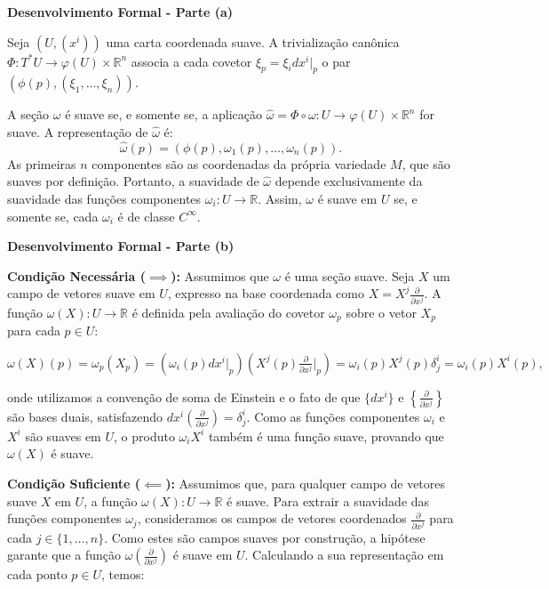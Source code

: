 {	\textbf{Desenvolvimento Formal - Parte (a)}
	
	Seja $(U, (x^i))$ uma carta coordenada suave. A trivialização canônica $\Phi: T^*U \to \varphi(U) \times \mathbb{R}^n$ associa a cada covetor $\xi_p = \xi_i dx^i|_p$ o par $(\phi(p), (\xi_1, \dots, \xi_n))$.
	
	A seção $\omega$ é suave se, e somente se, a aplicação $\hat{\omega} = \Phi \circ \omega : U \to \varphi(U) \times \mathbb{R}^n$ for suave. A representação de $\hat{\omega}$ é:
	\begin{equation*}
		\hat{\omega}(p) = (\phi(p), \omega_1(p), \dots, \omega_n(p)).
	\end{equation*}
	As primeiras $n$ componentes são as coordenadas da própria variedade $M$, que são suaves por definição. Portanto, a suavidade de $\hat{\omega}$ depende exclusivamente da suavidade das funções componentes $\omega_i : U \to \mathbb{R}$. Assim, $\omega$ é suave em $U$ se, e somente se, cada $\omega_i$ é de classe $C^\infty$.
	
	\textbf{Desenvolvimento Formal - Parte (b)}
	
	\textbf{Condição Necessária ($\implies$):} Assumimos que $\omega$ é uma seção suave. Seja $X$ um campo de vetores suave em $U$, expresso na base coordenada como $X = X^j \tfrac{\partial}{\partial x^j}$. A função $\omega(X): U \to \mathbb{R}$ é definida pela avaliação do covetor $\omega_p$ sobre o vetor $X_p$ para cada $p \in U$:
	
	\begin{equation*}
		\omega(X)(p) = \omega_p(X_p) = \left( \omega_i(p) dx^i|_p \right) \left( X^j(p) \tfrac{\partial}{\partial x^j} \Big|_p \right) = \omega_i(p) X^j(p) \delta^i_j = \omega_i(p) X^i(p),
	\end{equation*}
	
	onde utilizamos a convenção de soma de Einstein e o fato de que $\{dx^i\}$ e $\left\{\tfrac{\partial}{\partial x^j}\right\}$ são bases duais, satisfazendo $dx^i \left( \tfrac{\partial}{\partial x^j} \right) = \delta^i_j$. Como as funções componentes $\omega_i$ e $X^i$ são suaves em $U$, o produto $\omega_i X^i$ também é uma função suave, provando que $\omega(X)$ é suave.
	
	\textbf{Condição Suficiente ($\impliedby$):} Assumimos que, para qualquer campo de vetores suave $X$ em $U$, a função $\omega(X): U \to \mathbb{R}$ é suave. Para extrair a suavidade das funções componentes $\omega_j$, consideramos os campos de vetores coordenados $\tfrac{\partial}{\partial x^j}$ para cada $j \in \{1, \dots, n\}$. Como estes são campos suaves por construção, a hipótese garante que a função $\omega\left(\tfrac{\partial}{\partial x^j}\right)$ é suave em $U$. Calculando a sua representação em cada ponto $p \in U$, temos:
	
}
